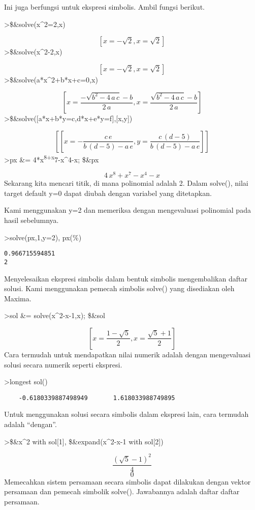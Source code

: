 \documentclass[
]{book}
\begin{document}
Ini juga berfungsi untuk ekspresi simbolis. Ambil fungsi berikut.

\textgreater\$\&solve(x\^{}2=2,x)

\[\left[ x=-\sqrt{2} , x=\sqrt{2} \right]\]\textgreater\$\&solve(x\^{}2-2,x)

\[\left[ x=-\sqrt{2} , x=\sqrt{2} \right]\]\textgreater\$\&solve(a*x\^{}2+b*x+c=0,x)

\[\left[ x=\frac{-\sqrt{b^2-4\,a\,c}-b}{2\,a} , x=\frac{\sqrt{b^2-4\, a\,c}-b}{2\,a} \right]\]\textgreater\$\&solve({[}a*x+b*y=c,d*x+e*y=f{]},{[}x,y{]})

\[\left[ \left[ x=-\frac{c\,e}{b\,\left(d-5\right)-a\,e} , y=\frac{c \,\left(d-5\right)}{b\,\left(d-5\right)-a\,e} \right]\right]\]\textgreater px \&= 4*x\textsuperscript{8+x}7-x\^{}4-x; \$\&px

\[4\,x^8+x^7-x^4-x\]Sekarang kita mencari titik, di mana polinomial adalah 2. Dalam solve(), nilai target default y=0 dapat diubah dengan variabel yang ditetapkan.

Kami menggunakan y=2 dan memeriksa dengan mengevaluasi polinomial pada hasil sebelumnya.

\textgreater solve(px,1,y=2), px(\%)

\begin{verbatim}
0.966715594851
2
\end{verbatim}

Menyelesaikan ekspresi simbolis dalam bentuk simbolis mengembalikan daftar solusi. Kami menggunakan pemecah simbolis solve() yang disediakan oleh Maxima.

\textgreater sol \&= solve(x\^{}2-x-1,x); \$\&sol

\[\left[ x=\frac{1-\sqrt{5}}{2} , x=\frac{\sqrt{5}+1}{2} \right] \]Cara termudah untuk mendapatkan nilai numerik adalah dengan mengevaluasi solusi secara numerik seperti ekspresi.

\textgreater longest sol()

\begin{verbatim}
    -0.6180339887498949       1.618033988749895 
\end{verbatim}

Untuk menggunakan solusi secara simbolis dalam ekspresi lain, cara termudah adalah ``dengan''.

\textgreater\$\&x\^{}2 with sol{[}1{]}, \$\&expand(x\^{}2-x-1 with sol{[}2{]})

\[\frac{\left(\sqrt{5}-1\right)^2}{4}\] \[0\]Memecahkan sistem persamaan secara simbolis dapat dilakukan dengan vektor persamaan dan pemecah simbolik solve(). Jawabannya adalah daftar daftar persamaan.
\end{document}
